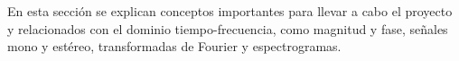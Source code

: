 En esta sección se explican conceptos importantes para llevar a cabo el proyecto y relacionados con el dominio tiempo-frecuencia, como magnitud y fase, señales mono y estéreo, transformadas de Fourier y espectrogramas.